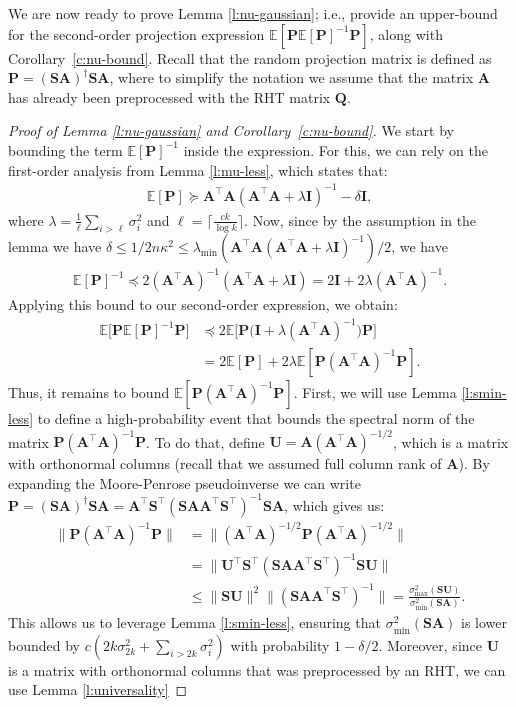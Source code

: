 \documentclass[11pt]{article}
\let\origtop\top
\renewcommand\top{{\scriptscriptstyle{\origtop}}}
\def\A{{\mathbf A}}
\def\I{{\mathbf I}}
\def\Q{{\mathbf Q}}
\def\S{{\mathbf S}}
\def\P{{\mathbf P}}
\def\E{{\mathds E}}
\def\U{{\mathbf U}}
\begin{document}
We are now ready to prove Lemma \ref{l:nu-gaussian}; i.e., provide an upper-bound for the second-order projection expression $\E[\P\E[\P]^{-1}\P]$, along with Corollary~\ref{c:nu-bound}. Recall that the random projection matrix is defined as $\P=(\S\A)^{\dagger}\S\A$, where to simplify the notation we assume that the matrix $\A$ has already been preprocessed with the RHT matrix $\Q$.
\begin{proof}[Proof of Lemma \ref{l:nu-gaussian} and Corollary~\ref{c:nu-bound}]
We start by bounding the term $\E[\P]^{-1}$ inside the expression. For this, we can rely on the first-order analysis from Lemma \ref{l:mu-less}, which states that:
\begin{align*}
    \E[\P]\succeq \A^\top\A(\A^\top\A+\lambda\I)^{-1}-\delta\I,
\end{align*}
where $\lambda =\frac1\ell\sum_{i>\ell}\sigma_i^2$ and $\ell = \lceil\frac {ck}{\log k}\rceil$. Now, since by the assumption in the lemma we have $\delta \leq 1 / 2 n \kappa^2 \leq   \lambda_{\min}(\A^\top\A(\A^\top\A+\lambda\I)^{-1})/2$, 
we have 
\begin{align*}
\E[\P]^{-1}\preceq 2(\A^\top\A)^{-1}(\A^\top\A+\lambda\I) = 2\I + 2\lambda(\A^\top\A)^{-1}.
\end{align*}
Applying this bound to our second-order expression, we obtain:
\begin{align*}
\E\big[\P\E[\P]^{-1}\P\big]
&\preceq 2\E\Big[\P\big(\I + \lambda(\A^\top\A)^{-1}\big)\P\Big]
\\
&= 2\E[\P] + 2\lambda \E[\P(\A^\top\A)^{-1}\P].
\end{align*}
Thus, it remains to bound $\E[\P(\A^\top\A)^{-1}\P]$.
First, we will use Lemma \ref{l:smin-less} to define a high-probability event  that bounds the spectral norm of the matrix $\P(\A^\top\A)^{-1}\P$. To do that, define $\U=\A(\A^\top\A)^{-1/2}$, which is a matrix with orthonormal columns (recall that we assumed full column rank of $\A$). By expanding the Moore-Penrose pseudoinverse we can write $\P=(\S\A)^\dagger\S\A=\A^\top\S^\top(\S\A\A^\top\S^\top)^{-1}\S\A$, which gives us:
 \begin{align*}
     \|\P(\A^\top\A)^{-1}\P\| 
    &= \|(\A^\top\A)^{-1/2}\P(\A^\top\A)^{-1/2}\| \\
    &= \|\U^\top\S^\top(\S\A\A^\top\S^\top)^{-1}\S\U\| \\
    &\leq \|\S\U\|^2\|(\S\A\A^\top\S^\top)^{-1}\| 
    = \frac{\sigma_{\max}^2(\S\U)}{\sigma_{\min}^2(\S\A)}.
 \end{align*}
 This allows us to leverage Lemma \ref{l:smin-less}, ensuring that $\sigma_{\min}^2(\S\A)$ is lower bounded by $c(2k\sigma_{2k}^2+\sum_{i>2k}\sigma_i^2)$ with probability $1-\delta/2$. Moreover, since $\U$ is a matrix with orthonormal columns that was preprocessed by an RHT, we can use Lemma \ref{l:universality} 

\end{proof}
\end{document}
